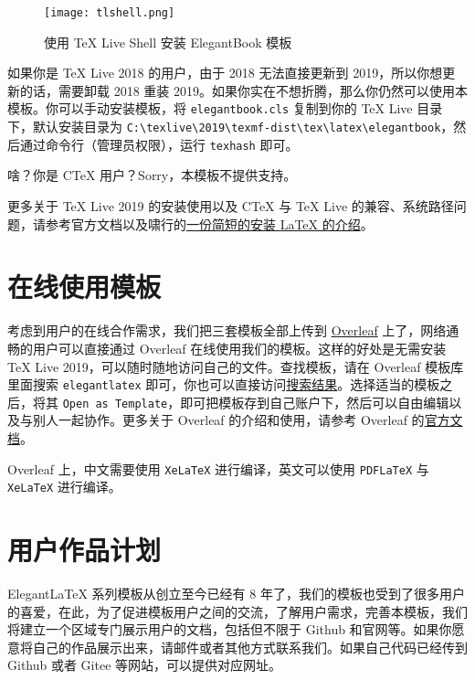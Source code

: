 \documentclass[cn,11pt]{elegantbook}
\begin{document}
\begin{figure}[htbp]
\centering
\texttt{[image: tlshell.png]}
\caption{使用 \TeX{} Live Shell 安装 ElegantBook 模板}
\end{figure}

如果你是 \TeX{} Live 2018 的用户，由于 2018 无法直接更新到 2019，所以你想更新的话，需要卸载 2018 重装 2019。如果你实在不想折腾，那么你仍然可以使用本模板。你可以手动安装模板，将 \lstinline{elegantbook.cls} 复制到你的 \TeX{} Live 目录下，默认安装目录为 \lstinline|C:\texlive\2019\texmf-dist\tex\latex\elegantbook|，然后通过命令行（管理员权限），运行 \lstinline{texhash} 即可。

啥？你是 C\TeX{} 用户？Sorry，本模板不提供支持。

更多关于 \TeX{} Live 2019 的安装使用以及 C\TeX{} 与 \TeX{} Live 的兼容、系统路径问题，请参考官方文档以及啸行的\href{https://github.com/OsbertWang/install_latex/releases}{一份简短的安装 \LaTeX{} 的介绍}。

\section{在线使用模板}
考虑到用户的在线合作需求，我们把三套模板全部上传到 \href{https://www.overleaf.com/}{Overleaf} 上了，网络通畅的用户可以直接通过 Overleaf 在线使用我们的模板。这样的好处是无需安装 \TeX{} Live 2019，可以随时随地访问自己的文件。查找模板，请在 Overleaf 模板库里面搜索 \lstinline{elegantlatex} 即可，你也可以直接访问\href{https://www.overleaf.com/latex/templates?addsearch=elegantlatex}{搜索结果}。选择适当的模板之后，将其 \lstinline{Open as Template}，即可把模板存到自己账户下，然后可以自由编辑以及与别人一起协作。更多关于 Overleaf 的介绍和使用，请参考 Overleaf 的\href{https://www.overleaf.com/learn}{官方文档}。

\begin{remark}
Overleaf 上，中文需要使用 \lstinline{XeLaTeX} 进行编译，英文可以使用 \lstinline{PDFLaTeX} 与 \lstinline{XeLaTeX} 进行编译。
\end{remark}

\section{用户作品计划}
Elegant\LaTeX{} 系列模板从创立至今已经有 8 年了，我们的模板也受到了很多用户的喜爱，在此，为了促进模板用户之间的交流，了解用户需求，完善本模板，我们将建立一个区域专门展示用户的文档，包括但不限于 Github 和官网等。如果你愿意将自己的作品展示出来，请邮件或者其他方式联系我们。如果自己代码已经传到 Github 或者 Gitee 等网站，可以提供对应网址。
\end{document}
